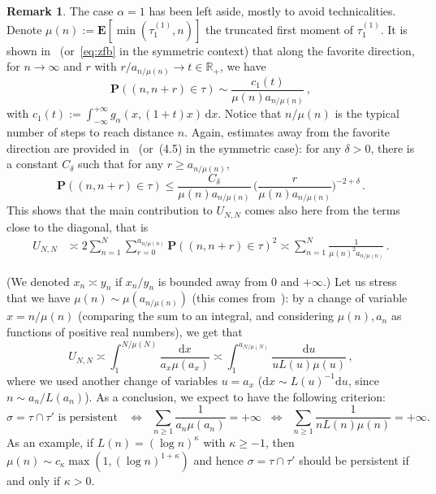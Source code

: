\documentclass[11pt]{article}
\theoremstyle{definition}
\newtheorem{rema}[theo]{Remark}
\numberwithin{equation}{section}
\numberwithin{figure}{section}
\numberwithin{table}{section}
\newcommand{\ga}{\alpha}
\newcommand{\gd}{\delta}
\newcommand{\dd}{\mathrm{d}}
\newcommand{\bP}{\ensuremath{\mathbf{P}}}
\newcommand{\bE}{\ensuremath{\mathbf{E}}}
\newcommand{\bbR}{\ensuremath{\mathbb{R}}}
\begin{document}
\begin{appendix}
\begin{rema}\label{rem:alpha=1}
The case $\ga=1$ has been left aside, mostly to avoid technicalities. Denote $\mu(n):=\bE[\min(\tau_1^{(1)}, n)]$ the truncated first moment of $\tau_1^{(1)}$. It is shown in~\cite[Theorem~3.4]{cf:B} (or~\eqref{eq:zfb} in the symmetric context) that along the favorite direction, for $n\to \infty$ and $r$ with $r/a_{n/\mu(n)} \to t\in \bbR_+$, we have
\begin{equation}\label{alpha=1}
\bP((n,n+r)\in\tau) \sim \frac{c_1(t)}{\mu(n) a_{n/\mu(n)}}\,,
\end{equation}
with $c_1(t):= \int_{-\infty}^{+\infty} g_{\alpha}(x,(1+t)x)\, \dd x$. Notice that $n/\mu(n)$ is the typical number of steps to reach distance $n$. Again, estimates away from the favorite direction are provided in~\cite[Theorem~4.2]{cf:B} (or~(4.5) in the symmetric case): for any $\gd>0$, there is a constant $C_{\gd}$ such that for any $r \ge a_{n/\mu(n)}$,
\begin{equation}\label{alpha=1away}
\bP((n,n+r)\in\tau) \le \frac{C_{\gd}}{\mu(n) a_{n/\mu(n)}}\,\Big(\frac{r}{\mu(n) a_{n/\mu(n)}} \Big)^{-2+\gd}\,.
\end{equation}
This shows that the main contribution to $U_{N,N}$ comes also here from the terms close to the diagonal, that is
\begin{align*}
U_{N,N} &\asymp 2\sum_{n=1}^N \sum_{r=0}^{a_{n/\mu(n)}} \bP((n,n+r)\in\tau)^2 \asymp \sum_{n=1}^N \frac{1}{\mu(n)^2 a_{n/\mu(n)}}\,.
\end{align*}

(We denoted $x_n\asymp y_n$ if $x_n/y_n$ is bounded away from $0$ and $+\infty$.) Let us stress that we have $\mu(n) \sim \mu(a_{n/\mu(n)})$ (this comes from~\cite[Lemma~4.3]{cf:B17}): by a change of variable $x= n/\mu(n)$ (comparing the sum to an integral, and considering $\mu(n),a_n$ as functions of positive real numbers), we get that
\[
U_{N,N}\asymp \int_{1}^{N/\mu(N)} \frac{\dd x}{ a_{x} \mu(a_x)} \asymp \int_1^{a_{N/\mu(N)}} \frac{\dd u}{u L(u) \mu(u)}\,,
\]
where we used another change of variables $u \!=\!a_x$ ($\dd x \!\sim\! L(u)^{-1}\dd u$, since $n\!\sim\! a_n/L(a_n)$). As a conclusion, we expect to have the following criterion:
\[
\sigma=\tau\cap \tau' \text{ is persistent } \;\; \Longleftrightarrow \;\; \sum_{n\geq 1} \frac{1}{a_n \mu(a_n)} =+\infty \;\; \Longleftrightarrow \;\; \sum_{n\geq 1} \frac{1}{n L(n)\mu(n)} =+\infty.
\]
As an example, if $L(n) =(\log n)^{\kappa}$ with $\kappa \geq -1$, then $\mu(n) \sim c_{\kappa} \max(1, (\log n)^{1+\kappa})$ and hence $\sigma=\tau\cap \tau'$ should be persistent if and only if $\kappa>0$.
\end{rema}
\end{appendix}
\end{document}
